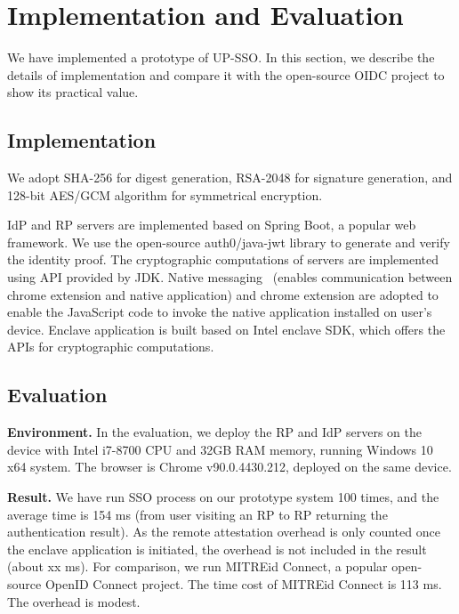 \section{Implementation and Evaluation}
\label{sec:implementation}
We have implemented  a prototype of UP-SSO.
In this section, we describe the details of implementation and compare it with the open-source OIDC project to show its practical value.
\subsection{Implementation}
We adopt SHA-256 for digest generation, RSA-2048 for signature generation, and 128-bit AES/GCM algorithm for symmetrical encryption. 


IdP and RP servers are implemented based on Spring Boot, a popular web framework. 
We use the open-source auth0/java-jwt library to generate and verify the identity proof. 
The cryptographic computations of servers are implemented using API provided by JDK. 
Native messaging~\cite{NativeMessaging} (enables communication between chrome extension and native application) and chrome extension are  adopted to enable the JavaScript code to invoke the native application installed on user's device. 
Enclave application is built based on Intel enclave SDK,
which offers the APIs for cryptographic computations.%

\subsection{Evaluation}
\noindent\textbf{Environment.}
In the evaluation, we deploy the RP and IdP servers on the device with Intel i7-8700 CPU and 32GB RAM memory, running Windows 10 x64 system. The browser is Chrome v90.0.4430.212, deployed on the same device.   



\vspace{1mm}\noindent\textbf{Result.}
We have run SSO process on our prototype system 100 times, and the average time is 154 ms (from user visiting an RP to RP returning the authentication result). As the remote attestation overhead is only counted once the enclave application is initiated, the overhead is not included in the result (about xx ms). For comparison, we run MITREid Connect, a popular open-source OpenID Connect project. The time cost of  MITREid Connect is 113 ms. The overhead is modest.